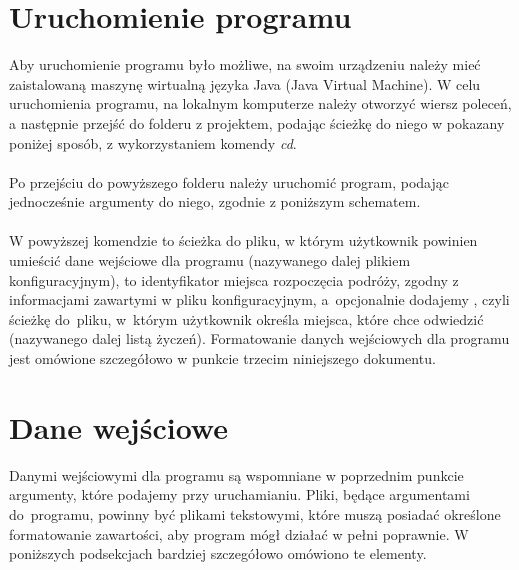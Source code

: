 \documentclass[12pt,a4paper]{article}
\begin{document}
\section{Uruchomienie programu}
Aby uruchomienie programu było możliwe, na swoim urządzeniu należy mieć zaistalowaną maszynę wirtualną języka Java (Java Virtual Machine). W celu uruchomienia programu, na lokalnym komputerze należy otworzyć wiersz poleceń, a następnie przejść do folderu z projektem, podając ścieżkę do niego w pokazany poniżej sposób, z wykorzystaniem komendy \textsl{cd}.\smallskip\\
\smallskip
{}\\
\indent Po przejściu do powyższego folderu należy uruchomić program, podając jednocześnie argumenty do niego, zgodnie z poniższym schematem.\smallskip\\
{\scriptsize{}\smallskip\\}
\indent W powyższej komendzie  to ścieżka do pliku, w którym użytkownik powinien umieścić dane wejściowe dla programu (nazywanego dalej plikiem konfiguracyjnym),  to identyfikator miejsca rozpoczęcia podróży, zgodny z informacjami zawartymi w pliku konfiguracyjnym, a~opcjonalnie dodajemy , czyli ścieżkę do~pliku, w~którym użytkownik określa miejsca, które chce odwiedzić (nazywanego dalej listą życzeń). Formatowanie danych wejściowych dla programu jest omówione szczegółowo w punkcie trzecim niniejszego dokumentu.
\section{Dane wejściowe}
Danymi wejściowymi dla programu są wspomniane w poprzednim punkcie argumenty, które podajemy przy uruchamianiu. Pliki, będące argumentami do~programu, powinny być plikami tekstowymi, które muszą posiadać określone formatowanie zawartości, aby program mógł działać w pełni poprawnie. W poniższych podsekcjach bardziej szczegółowo omówiono te elementy.
\newpage
\end{document}
